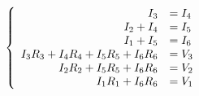 \documentclass{article}
\begin{document}
\thispagestyle{empty}

$$
\left \{ \begin{array}{r l}
I_3     &= I_4\\
I_2+I_4 &= I_5\\
I_1+I_5 &= I_6\\
I_3R_3 + I_4R_4 + I_5R_5+I_6R_6 &= V_3\\
I_2R_2 + I_5R_5+I_6R_6 &= V_2\\
I_1R_1 +I_6R_6 &= V_1\\
\end{array} \right.
$$
\end{document}
